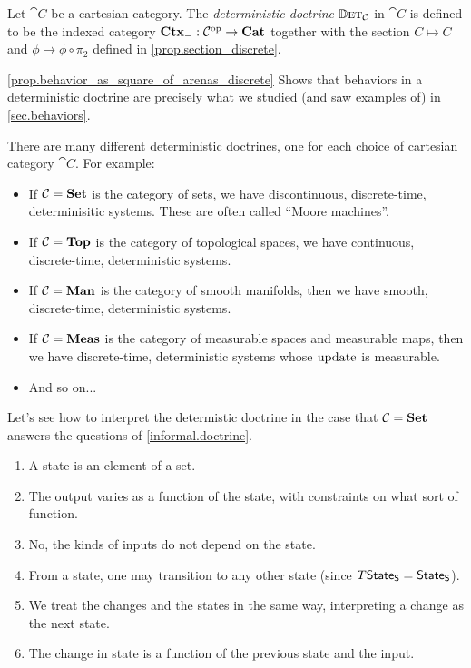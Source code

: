 \documentclass[DynamicalBook]{subfiles}
\begin{document}
\begin{definition}\label{def.deterministic_doctrines}
  Let $\cat{C}$ be a cartesian category. The \emph{deterministic doctrine}
  $\mathbb{D}\textsc{et}_{\mathcal{C}}$ in $\cat{C}$ is defined to be the indexed category
  $\textbf{Ctx}_{-}: \mathcal{C}^{\textnormal{op}} \to \textbf{Cat}$ together with the section $C \mapsto C$
  and $\phi \mapsto \phi \circ \pi_2$ defined in \cref{prop.section_discrete}.
\end{definition}

\begin{remark}
 \cref{prop.behavior_as_square_of_arenas_discrete} Shows that behaviors in a
 deterministic doctrine are precisely what we studied (and saw examples of) in \cref{sec.behaviors}.
\end{remark}

There are many different deterministic doctrines, one for each choice of
cartesian category $\cat{C}$. For example:
\begin{itemize}
  \item If $\mathcal{C} = \textbf{Set}$ is the category of sets, we have discontinuous, discrete-time,
    determinisitic systems. These are often called ``Moore machines''.
  \item If $\mathcal{C} = \textbf{Top}$ is the category of topological spaces, we have
    continuous, discrete-time, deterministic systems.
  \item If $\mathcal{C} = \textbf{Man}$ is the category of smooth manifolds, then we
    have smooth, discrete-time, deterministic systems.
  \item If $\mathcal{C} = \textbf{Meas}$ is the category of measurable spaces and
    measurable maps, then we have discrete-time, deterministic systems whose
    $\mathrm{update}_{\mathsf{}}$ is measurable.
  \item And so on...
\end{itemize}

Let's see how to interpret the determistic doctrine in the case that $\mathcal{C} =
\textbf{Set}$ answers the questions of \cref{informal.doctrine}.
\begin{enumerate}
 \item A state is an element of a set.
 \item The output varies as a function of the state, with constraints on what
   sort of function.
 \item No, the kinds of inputs do not depend on the state.
 \item From a state, one may transition to any other state (since $T\mathsf{State}_{\mathsf{S}} = \mathsf{State}_{\mathsf{S}}$).
 \item We treat the changes and the states in the same way, interpreting a
   change as the next state.
 \item The change in state is a function of the previous state and the input.
\end{enumerate}
\end{document}
